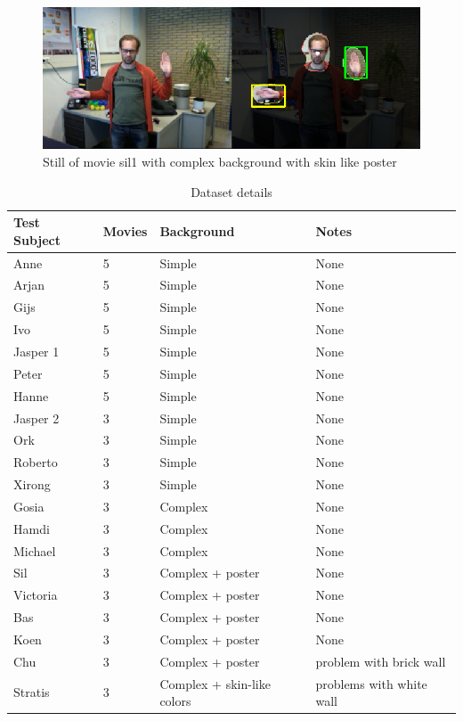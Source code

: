 \begin{figure}[htbp]
\center{}
\includegraphics[width=0.8\linewidth]{figures/complexposter.png}
\caption{Still of movie sil1 with complex background with skin like poster}
\label{fig:complexposterbackground}
\end{figure}


\begin{table}
\centering
\begin{tabular}{llll}
\hline\hline
	Test Subject & Movies & Background & Notes \\
\hline
	Anne     & 5 & Simple & None \\
	Arjan    & 5 & Simple & None \\
	Gijs     & 5 & Simple & None \\
	Ivo      & 5 & Simple & None \\
	Jasper 1 & 5 & Simple & None \\
	Peter    & 5 & Simple & None \\
	Hanne    & 5 & Simple & None \\
	Jasper 2 & 3 & Simple & None \\
	Ork      & 3 & Simple & None \\
	Roberto  & 3 & Simple & None \\
	Xirong   & 3 & Simple & None \\
	Gosia    & 3 & Complex & None \\
	Hamdi    & 3 & Complex & None \\
	Michael  & 3 & Complex & None \\
	Sil      & 3 & Complex + poster & None \\
	Victoria & 3 & Complex + poster & None \\
	Bas      & 3 & Complex + poster & None \\
	Koen     & 3 & Complex + poster & None \\
	Chu      & 3 & Complex + poster & problem with brick wall \\
	Stratis  & 3 & Complex + skin-like colors & problems with white wall \\
\hline
\end{tabular}
\caption{Dataset details}
\end{table}

